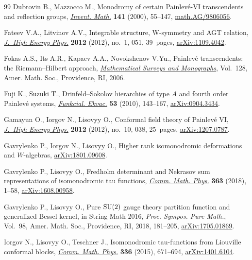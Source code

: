 \documentclass[pdftex]{sigma}
\numberwithin{equation}{section}
\begin{document}
\begin{thebibliography}{99}
Dubrovin B., Mazzocco M., Monodromy of certain {P}ainlev\'{e}-{VI}
 transcendents and reflection groups, \href{https://doi.org/10.1007/PL00005790}{\textit{Invent. Math.}} \textbf{141}
 (2000), 55--147, \href{https://arxiv.org/abs/math.AG/9806056}{math.AG/9806056}.

Fateev V.A., Litvinov A.V., Integrable structure, {W}-symmetry and {AGT}
 relation, \href{https://doi.org/10.1007/JHEP01(2012)051}{\textit{J.~High Energy Phys.}} \textbf{2012} (2012), no.~1, 051,
 39~pages, \href{https://arxiv.org/abs/1109.4042}{arXiv:1109.4042}.

Fokas A.S., Its A.R., Kapaev A.A., Novokshenov V.Yu., Painlev\'{e}
 transcendents: the {R}iemann--{H}ilbert approach, \href{https://doi.org/10.1090/surv/128}{\textit{Mathematical
 Surveys and Monographs}}, Vol.~128, Amer. Math. Soc., Providence, RI, 2006.

Fuji K., Suzuki T., Drinfeld--{S}okolov hierarchies of type {$A$} and fourth
 order {P}ainlev\'{e} systems, \href{https://doi.org/10.1619/fesi.53.143}{\textit{Funkcial. Ekvac.}} \textbf{53} (2010),
 143--167, \href{https://arxiv.org/abs/0904.3434}{arXiv:0904.3434}.

Gamayun O., Iorgov N., Lisovyy O., Conformal field theory of {P}ainlev\'{e}
 {VI}, \href{https://doi.org/10.1007/JHEP10(2012)038}{\textit{J.~High Energy Phys.}} \textbf{2012} (2012), no.~10, 038,
 25~pages, \href{https://arxiv.org/abs/1207.0787}{arXiv:1207.0787}.

Gavrylenko P., Iorgov N., Lisovyy O., Higher rank isomonodromic deformations
 and {$W$}-algebras, \href{https://arxiv.org/abs/1801.09608}{arXiv:1801.09608}.

Gavrylenko P., Lisovyy O., Fredholm determinant and {N}ekrasov sum
 representations of isomonodromic tau functions, \href{https://doi.org/10.1007/s00220-018-3224-7}{\textit{Comm. Math. Phys.}}
 \textbf{363} (2018), 1--58, \href{https://arxiv.org/abs/1608.00958}{arXiv:1608.00958}.

Gavrylenko P., Lisovyy O., Pure {${\rm SU}(2)$} gauge theory partition function
 and generalized {B}essel kernel, in String-{M}ath 2016, \textit{Proc. Sympos.
 Pure Math.}, Vol.~98, Amer. Math. Soc., Providence, RI, 2018, 181--205,
 \href{https://arxiv.org/abs/1705.01869}{arXiv:1705.01869}.

Iorgov N., Lisovyy O., Teschner J., Isomonodromic tau-functions from
 {L}iouville conformal blocks, \href{https://doi.org/10.1007/s00220-014-2245-0}{\textit{Comm. Math. Phys.}} \textbf{336} (2015),
 671--694, \href{https://arxiv.org/abs/1401.6104}{arXiv:1401.6104}.


\end{thebibliography}
\end{document}

